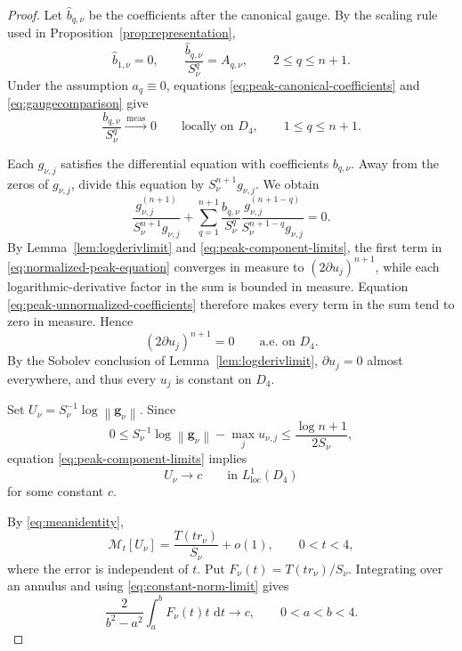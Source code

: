 \documentclass[12pt,letterpaper,reqno]{amsart}
\theoremstyle{definition}
\numberwithin{equation}{section}
\newcommand{\dd}{\,\mathrm d}
\newcommand{\loc}{\mathrm{loc}}
\newcommand{\mean}[2]{\mathcal M_{#1}\!\left[#2\right]}
\newcommand{\norm}[1]{\left\lVert#1\right\rVert}
\newcommand{\convmeas}{\xrightarrow{\,\mathrm{meas}\,}}
\newcommand{\gv}{\bm g}
\begin{document}
\begin{proof}
Let \(\widehat b_{q,\nu}\) be the coefficients after the canonical
gauge. By the scaling rule used in
Proposition~\ref{prop:representation},
\begin{equation}\label{eq:peak-canonical-coefficients}
 \widehat b_{1,\nu}=0,
 \qquad
 \frac{\widehat b_{q,\nu}}{S_\nu^q}
 =
 A_{q,\nu},
 \qquad
 2\leq q\leq n+1.
\end{equation}
Under the assumption \(a_q\equiv0\), equations
\eqref{eq:peak-canonical-coefficients} and
\eqref{eq:gaugecomparison} give
\begin{equation}\label{eq:peak-unnormalized-coefficients}
 \frac{b_{q,\nu}}{S_\nu^q}
 \convmeas0
 \qquad\text{locally on }D_4,
 \qquad
 1\leq q\leq n+1.
\end{equation}

Each \(g_{\nu,j}\) satisfies the differential equation with coefficients
\(b_{q,\nu}\). Away from the zeros of \(g_{\nu,j}\), divide this
equation by \(S_\nu^{n+1}g_{\nu,j}\). We obtain
\begin{equation}\label{eq:normalized-peak-equation}
 \frac{g_{\nu,j}^{(n+1)}}{S_\nu^{n+1}g_{\nu,j}}
 +
 \sum_{q=1}^{n+1}
 \frac{b_{q,\nu}}{S_\nu^q}
 \frac{g_{\nu,j}^{({n+1}-q)}}
      {S_\nu^{{n+1}-q}g_{\nu,j}}
 =
 0.
\end{equation}
By Lemma~\ref{lem:logderivlimit} and
\eqref{eq:peak-component-limits},
the first term in \eqref{eq:normalized-peak-equation} converges in
measure to \((2\partial u_j)^{n+1}\), while each logarithmic-derivative
factor in the sum is bounded in measure. Equation
\eqref{eq:peak-unnormalized-coefficients} therefore makes every term
in the sum tend to zero in measure. Hence
\[
(2\partial u_j)^{n+1}=0
\qquad\text{a.e.\ on }D_4.
\]
By the Sobolev conclusion of Lemma~\ref{lem:logderivlimit},
\(\partial u_j=0\) almost everywhere, and thus every \(u_j\) is
constant on \(D_4\).

Set
\(U_\nu=S_\nu^{-1}\log\norm{\gv_\nu}\).
Since
\[
0\leq
S_\nu^{-1}\log\norm{\gv_\nu}
-
\max_j u_{\nu,j}
\leq
\frac{\log {n+1}}{2S_\nu},
\]
equation \eqref{eq:peak-component-limits} implies
\begin{equation}\label{eq:constant-norm-limit}
 U_\nu\longrightarrow c
 \qquad\text{in }L^1_{\loc}(D_4)
\end{equation}
for some constant \(c\).

By \eqref{eq:meanidentity},
\[
\mean t{U_\nu}
=
\frac{T(tr_\nu)}{S_\nu}+o(1),
\qquad
0<t<4,
\]
where the error is independent of \(t\). Put
\(F_\nu(t)=T(tr_\nu)/S_\nu\). Integrating over an annulus and using
\eqref{eq:constant-norm-limit} gives
\begin{equation}\label{eq:annular-characteristic-limit}
 \frac{2}{b^2-a^2}
 \int_a^b F_\nu(t)t\,\dd t
 \longrightarrow c,
 \qquad
 0<a<b<4.
\end{equation}


\end{proof}
\end{document}
